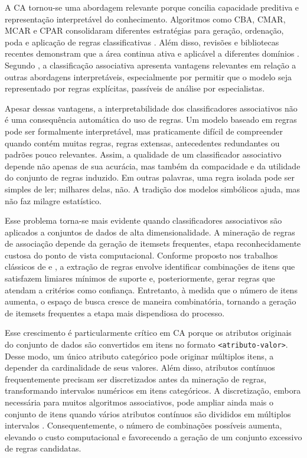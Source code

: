 A CA tornou-se uma abordagem relevante porque concilia capacidade preditiva e representação interpretável do conhecimento. Algoritmos como CBA, CMAR, MCAR e CPAR consolidaram diferentes estratégias para geração, ordenação, poda e aplicação de regras classificativas \cite{liu1998,Li2001,1387030,Dehkordi2006}. Além disso, revisões e bibliotecas recentes demonstram que a área continua ativa e aplicável a diferentes domínios \cite{THABTAH:2007:RAC,Hahsler2019254,Padillo2020}. Segundo , a classificação associativa apresenta vantagens relevantes em relação a outras abordagens interpretáveis, especialmente por permitir que o modelo seja representado por regras explícitas, passíveis de análise por especialistas.

Apesar dessas vantagens, a interpretabilidade dos classificadores associativos não é uma consequência automática do uso de regras. Um modelo baseado em regras pode ser formalmente interpretável, mas praticamente difícil de compreender quando contém muitas regras, regras extensas, antecedentes redundantes ou padrões pouco relevantes. Assim, a qualidade de um classificador associativo depende não apenas de sua acurácia, mas também da compacidade e da utilidade do conjunto de regras induzido. Em outras palavras, uma regra isolada pode ser simples de ler; milhares delas, não. A tradição dos modelos simbólicos ajuda, mas não faz milagre estatístico.

Esse problema torna-se mais evidente quando classificadores associativos são aplicados a conjuntos de dados de alta dimensionalidade. A mineração de regras de associação depende da geração de itemsets frequentes, etapa reconhecidamente custosa do ponto de vista computacional. Conforme proposto nos trabalhos clássicos de  e , a extração de regras envolve identificar combinações de itens que satisfazem limiares mínimos de suporte e, posteriormente, gerar regras que atendam a critérios como confiança. Entretanto, à medida que o número de itens aumenta, o espaço de busca cresce de maneira combinatória, tornando a geração de itemsets frequentes a etapa mais dispendiosa do processo.

Esse crescimento é particularmente crítico em CA porque os atributos originais do conjunto de dados são convertidos em itens no formato \texttt{<atributo-valor>}. Desse modo, um único atributo categórico pode originar múltiplos itens, a depender da cardinalidade de seus valores. Além disso, atributos contínuos frequentemente precisam ser discretizados antes da mineração de regras, transformando intervalos numéricos em itens categóricos. A discretização, embora necessária para muitos algoritmos associativos, pode ampliar ainda mais o conjunto de itens quando vários atributos contínuos são divididos em múltiplos intervalos \cite{conf/ijcai/FayyadI93}. Consequentemente, o número de combinações possíveis aumenta, elevando o custo computacional e favorecendo a geração de um conjunto excessivo de regras candidatas.

